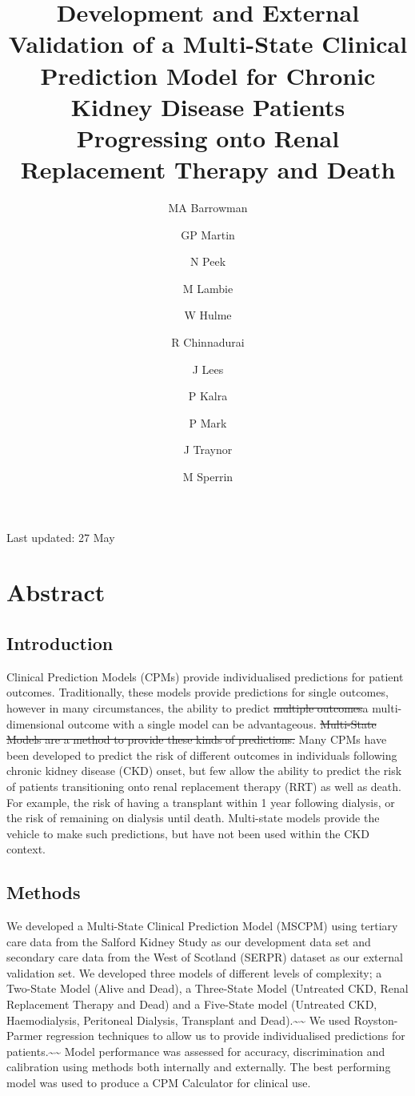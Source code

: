 \documentclass[
]{article}
\title{Development and External Validation of a Multi-State Clinical Prediction Model for Chronic Kidney Disease Patients Progressing onto Renal Replacement Therapy and Death}
\author{MA Barrowman \and GP Martin \and N Peek \and M Lambie \and W Hulme \and R Chinnadurai \and J Lees \and P Kalra \and P Mark \and J Traynor \and M Sperrin}
\date{}
\begin{document}
\maketitle

{
\setcounter{tocdepth}{2}
\tableofcontents
}
Last updated: 27 May

\hypertarget{abstract}{%
\section*{Abstract}\label{abstract}}

\hypertarget{introduction}{%
\subsection*{Introduction}\label{introduction}}

Clinical Prediction Models (CPMs) provide individualised predictions for patient outcomes. Traditionally, these models provide predictions for single outcomes, however in many circumstances, the ability to predict \sout{multiple outcomes}a multi-dimensional outcome with a single model can be advantageous. \sout{Multi-State Models are a method to provide these kinds of predictions.} Many CPMs have been developed to predict the risk of different outcomes in individuals following chronic kidney disease (CKD) onset, but few allow the ability to predict the risk of patients transitioning onto renal replacement therapy (RRT) as well as death. For example, the risk of having a transplant within 1 year following dialysis, or the risk of remaining on dialysis until death. Multi-state models provide the vehicle to make such predictions, but have not been used within the CKD context.

\hypertarget{methods}{%
\subsection*{Methods}\label{methods}}

We developed a Multi-State Clinical Prediction Model (MSCPM) using tertiary care data from the Salford Kidney Study as our development data set and secondary care data from the West of Scotland (SERPR) dataset as our external validation set. We developed three models of different levels of complexity; a Two-State Model (Alive and Dead), a Three-State Model (Untreated CKD, Renal Replacement Therapy and Dead) and a Five-State model (Untreated CKD, Haemodialysis, Peritoneal Dialysis, Transplant and Dead).\textasciitilde\textasciitilde{} We used Royston-Parmer regression techniques to allow us to provide individualised predictions for patients.\textasciitilde\textasciitilde{} Model performance was assessed for accuracy, discrimination and calibration using methods both internally and externally. The best performing model was used to produce a CPM Calculator for clinical use.
\end{document}
